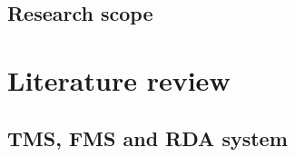 \documentclass[12pt,twoside]{reedthesis}
\begin{document}
\hypertarget{research-scope}{%
\section*{Research scope}\label{research-scope}}

\hypertarget{literature-review}{%
\chapter{Literature review}\label{literature-review}}

\hypertarget{tms-fms-and-rda-system}{%
\section{TMS, FMS and RDA system}\label{tms-fms-and-rda-system}}
\end{document}

